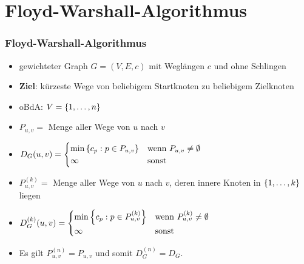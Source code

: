 \documentclass{beamer}
\begin{document}
\begin{frame}
\begin{minipage}{\dimexpr0.5\linewidth-\fboxrule-\fboxsep}
		\bigskip
		
	\end{minipage}
\end{frame}


\section{Floyd-Warshall-Algorithmus}

\begin{frame} \frametitle{Floyd-Warshall-Algorithmus}
	\small
	\begin{itemize}
		\item gewichteter Graph $G = (V,E,c)$ mit Weglängen $c$ und ohne Schlingen
		\item \textbf{Ziel}: kürzeste Wege von beliebigem Startknoten zu beliebigem Zielknoten
		\item oBdA: $V = \left\{ 1, \dots, n \right\}$
		\pause
		\item $P_{u,v} =$ Menge aller Wege von $u$ nach $v$
		\item $D_G (u,v) = \begin{cases}
		\min\left\{ c_p : p \in P_{u,v} \right\} & \text{wenn } P_{u,v} \neq \emptyset \\
		\infty & \text{sonst}
		\end{cases}$
		\pause
		\item $P^{(k)}_{u,v} =$ Menge aller Wege von $u$ nach $v$, deren innere Knoten in $\left\{ 1, \dots, k \right\}$ liegen
		\item $D_G^{(k)} (u,v) = \begin{cases}
		\min\left\{ c_p : p \in P_{u,v}^{(k)} \right\} & \text{wenn } P_{u,v}^{(k)} \neq \emptyset \\
		\infty & \text{sonst}
		\end{cases}$
		\pause
		\item Es gilt $P^{(n)}_{u,v} = P_{u,v}$ und somit $D_G^{(n)} = D_G$.
	\end{itemize}
\end{frame}
\end{document}

